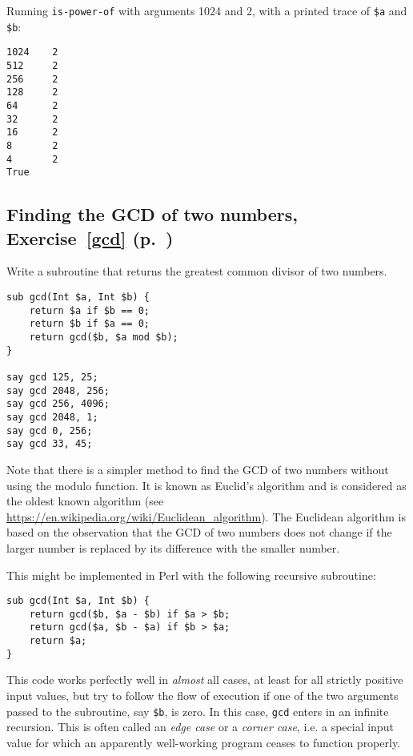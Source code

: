 Running {\tt is-power-of} with arguments 1024 and 2, 
with a printed trace of \verb'$a' and \verb'$b':

\begin{verbatim}
1024    2
512     2
256     2
128     2
64      2
32      2
16      2
8       2
4       2
True
\end{verbatim}
%

\subsection{Finding the GCD of two numbers, Exercise~\ref{gcd} (p.~\pageref{gcd})}
\label{sol_gcd}

Write a subroutine that returns the greatest common divisor of two numbers.

\begin{verbatim}
sub gcd(Int $a, Int $b) {
    return $a if $b == 0;
    return $b if $a == 0;
    return gcd($b, $a mod $b);
}

say gcd 125, 25;
say gcd 2048, 256;
say gcd 256, 4096;
say gcd 2048, 1;
say gcd 0, 256;
say gcd 33, 45;
\end{verbatim}

Note that there is a simpler method to find the GCD of 
two numbers without using the modulo function. It is known
as Euclid's algorithm and is considered as the oldest known 
algorithm (see \url{https://en.wikipedia.org/wiki/Euclidean_algorithm}). The Euclidean algorithm is based on 
the observation that the GCD of two numbers does not change 
if the larger number is replaced by its difference with 
the smaller number.

This might be implemented in Perl with the following recursive 
subroutine:

\begin{verbatim}
sub gcd(Int $a, Int $b) { 
    return gcd($b, $a - $b) if $a > $b;
    return gcd($a, $b - $a) if $b > $a;
    return $a;
}
\end{verbatim}
%

This code works perfectly well in \emph{almost} all cases, 
at least for all strictly positive input values, 
but try to follow the flow of execution if one of the 
two arguments passed to the subroutine, say {\tt \$b}, 
is zero. In this case, {\tt gcd} enters in an infinite 
recursion. This is often called an \emph{edge case} or a 
\emph{corner case}, i.e. a special input value for which 
an apparently well-working program ceases to function properly.

